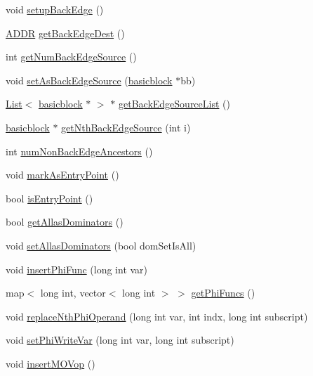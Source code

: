 \begin{DoxyCompactItemize}
\item 
void \hyperlink{classbasicblock_a46149b611069f8c2f1328311ea4b7803}{setupBackEdge} ()
\item 
\hyperlink{binaryTranslator_2global_8h_aa4557b0650cb21e57e3e4623410832c6}{ADDR} \hyperlink{classbasicblock_a0aa9e7f9af5171d5cd4bad3503cc45c8}{getBackEdgeDest} ()
\item 
int \hyperlink{classbasicblock_a4e6b8abafbdff3155477bdefd7546ef9}{getNumBackEdgeSource} ()
\item 
void \hyperlink{classbasicblock_a26f134ff2983953107999162e764c52a}{setAsBackEdgeSource} (\hyperlink{classbasicblock}{basicblock} $\ast$bb)
\item 
\hyperlink{classList}{List}$<$ \hyperlink{classbasicblock}{basicblock} $\ast$ $>$ $\ast$ \hyperlink{classbasicblock_a20313080c67808c6db8fc8c311ba5165}{getBackEdgeSourceList} ()
\item 
\hyperlink{classbasicblock}{basicblock} $\ast$ \hyperlink{classbasicblock_a7c5a3da3287691450420e3a6cf3105b1}{getNthBackEdgeSource} (int i)
\item 
int \hyperlink{classbasicblock_ad05a1a1f24dfb10d2c637065eaea2835}{numNonBackEdgeAncestors} ()
\item 
void \hyperlink{classbasicblock_a3da24f399435a4ba33a464925d4ded05}{markAsEntryPoint} ()
\item 
bool \hyperlink{classbasicblock_a81b824d2e109bb3b9484eb021fdd0a80}{isEntryPoint} ()
\item 
bool \hyperlink{classbasicblock_ad5a6467f9a1628c658671d2f432cbeba}{getAllasDominators} ()
\item 
void \hyperlink{classbasicblock_a11c8e9c8e6e38864552bafcd041e7a08}{setAllasDominators} (bool domSetIsAll)
\item 
void \hyperlink{classbasicblock_a1aeb2fc7325b987bced690cabf8d296d}{insertPhiFunc} (long int var)
\item 
map$<$ long int, vector$<$ long int $>$ $>$ \hyperlink{classbasicblock_a3b5148a1563478d689e1e3796ebd7dba}{getPhiFuncs} ()
\item 
void \hyperlink{classbasicblock_a129efbec925894799b11962ee9ec8b72}{replaceNthPhiOperand} (long int var, int indx, long int subscript)
\item 
void \hyperlink{classbasicblock_a8b4180d38d685e0def92a4512ab4f1ce}{setPhiWriteVar} (long int var, long int subscript)
\item 
void \hyperlink{classbasicblock_a86973a86f54f7d42ee2e3871a0ff47e1}{insertMOVop} ()
\item 

\end{DoxyCompactItemize}
